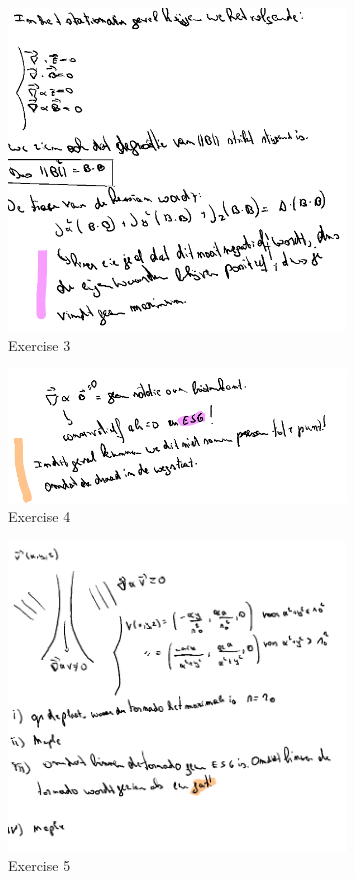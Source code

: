 \documentclass[a4paper]{report}
\begin{document}
\begin{figure}[H]
	\centering
	\includegraphics[width=0.8\textwidth]{assets/huis_6_ex_3.png}
	\caption{Exercise 3}
	\label{fig:huis_6_ex_3}
\end{figure}


\begin{figure}[H]
	\centering
	\includegraphics[width=0.8\textwidth]{assets/huis_6_ex_4.png}
	\caption{Exercise 4}
	\label{fig:huis_6_ex_4}
\end{figure}


\begin{figure}[H]
	\centering
	\includegraphics[width=0.8\textwidth]{assets/huis_6_ex_5.png}
	\caption{Exercise 5}
	\label{fig:huis_6_ex_5}
\end{figure}
\end{document}
